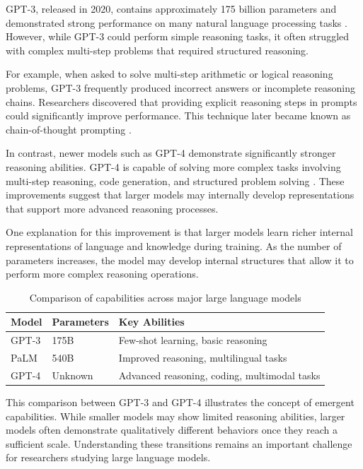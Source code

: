 \documentclass[conference]{IEEEtran}
\begin{document}
GPT-3, released in 2020, contains approximately 175 billion parameters and demonstrated strong performance on many natural language processing tasks \cite{brown2020gpt3}. However, while GPT-3 could perform simple reasoning tasks, it often struggled with complex multi-step problems that required structured reasoning.

For example, when asked to solve multi-step arithmetic or logical reasoning problems, GPT-3 frequently produced incorrect answers or incomplete reasoning chains. Researchers discovered that providing explicit reasoning steps in prompts could significantly improve performance. This technique later became known as chain-of-thought prompting \cite{wei2022cot}.

In contrast, newer models such as GPT-4 demonstrate significantly stronger reasoning abilities. GPT-4 is capable of solving more complex tasks involving multi-step reasoning, code generation, and structured problem solving \cite{openai2023gpt4}. These improvements suggest that larger models may internally develop representations that support more advanced reasoning processes.

One explanation for this improvement is that larger models learn richer internal representations of language and knowledge during training. As the number of parameters increases, the model may develop internal structures that allow it to perform more complex reasoning operations.

\begin{table}[h]
\centering
\begin{tabular}{lll}
\toprule
Model & Parameters & Key Abilities \\
\midrule
GPT-3 & 175B & Few-shot learning, basic reasoning \\
PaLM & 540B & Improved reasoning, multilingual tasks \\
GPT-4 & Unknown & Advanced reasoning, coding, multimodal tasks \\
\bottomrule
\end{tabular}
\caption{Comparison of capabilities across major large language models}
\end{table}

This comparison between GPT-3 and GPT-4 illustrates the concept of emergent capabilities. While smaller models may show limited reasoning abilities, larger models often demonstrate qualitatively different behaviors once they reach a sufficient scale. Understanding these transitions remains an important challenge for researchers studying large language models.
\end{document}
